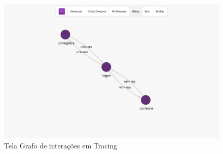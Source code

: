     \begin{figure}[htb]
		\caption{\label{fig_frontend_tracing}Tela Grafo de interações em Tracing}
		\begin{center}
		\includegraphics[width=\textwidth,keepaspectratio]{pictures/frontend/frontend-tracing.png}
		\end{center}
	\end{figure}

